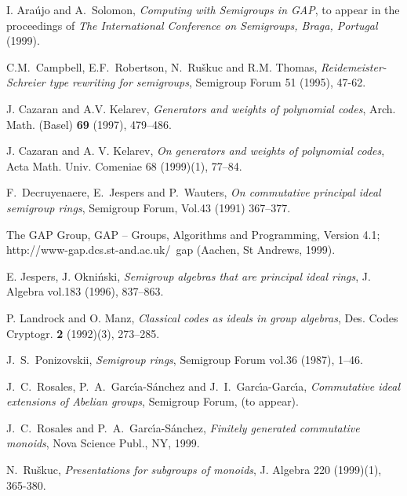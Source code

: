 \documentclass{acmconf}
\def\gap{\sf GAP}
\begin{document}
\begin{thebibliography}{9}

 I. Ara\'ujo and A.~Solomon, 
{\em Computing with Semigroups in GAP},
to appear in the proceedings of {\em The International Conference on
Semigroups, Braga, Portugal}  (1999).

C.M.~Campbell, E.F.~Robertson, N.~Ru\v{s}kuc and  R.M. Thomas,
{\it Reidemeister-Schreier type rewriting for semigroups},
Semigroup Forum 51 (1995), 47-62.


J. Cazaran and A.V. Kelarev,
{\it Generators and weights of polynomial codes},
Arch. Math. (Basel) {\bf 69} (1997), 479--486.

J. Cazaran and A. V. Kelarev,
{\it On generators and weights of polynomial codes},
Acta Math. Univ. Comeniae 68 (1999)(1), 77--84.


   F.~Decruyenaere, E.~Jespers and P.~Wauters, 
	\emph{On commutative principal ideal semigroup rings},
   Semigroup Forum, Vol.43 (1991) 367--377.

 The GAP Group, {\gap} -- Groups, Algorithms and Programming,
Version 4.1; http://www-gap.dcs.st-and.ac.uk/~gap (Aachen, St Andrews, 1999).

 E. Jespers, J. Okni\'{n}ski, 
\emph{Semigroup algebras that are principal ideal rings}, 
J. Algebra vol.183 (1996), 837--863.

P. Landrock and  O. Manz,
{\it Classical codes as ideals in group algebras},
Des. Codes Cryptogr. {\bf 2} (1992)(3), 273--285.


 J.~S.~Ponizovskii, 
\emph{Semigroup rings}, Semigroup Forum vol.36 (1987), 1--46.


   J.~C.~Rosales, P.~A.~Garc\'{\i}a-S\'{a}nchez and 
	J.~I.~Garc\'{\i}a-Garc\'{\i}a,
  \emph{Commutative ideal extensions of Abelian groups},
   Semigroup Forum, (to appear).


   J.~C.~Rosales and  P.~A.~Garc\'{\i}a-S\'{a}nchez,
  \emph{Finitely generated commutative monoids}, Nova Science Publ., NY, 1999.

N.~Ru\v{s}kuc,
{\it Presentations for subgroups of monoids},
J. Algebra 220 (1999)(1), 365-380.



 
\end{thebibliography}
\end{document}
